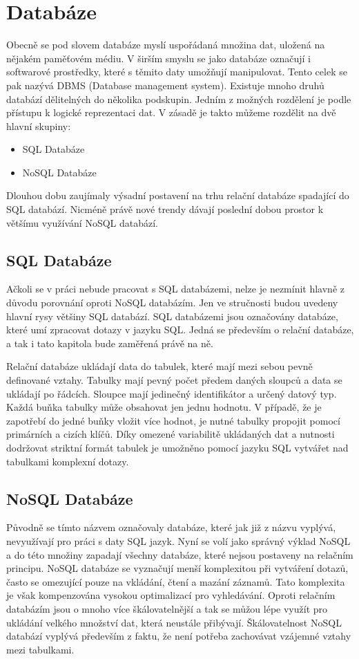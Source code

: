 \documentclass[thesis=M,czech]{FITthesis}[2012/06/26]
\begin{document}
\section{Databáze}
Obecně se pod slovem databáze myslí uspořádaná množina dat, uložená na nějakém paměťovém médiu. V širším smyslu se jako databáze označují i softwarové prostředky, které s těmito daty umožňují manipulovat. Tento celek se pak nazývá DBMS (Database management system). Existuje mnoho druhů databází dělitelných do několika podskupin. Jedním z možných rozdělení je podle přístupu k logické reprezentaci dat. V zásadě je takto můžeme rozdělit na dvě hlavní skupiny:

\begin{itemize}
\item SQL Databáze
\item NoSQL Databáze
\end{itemize}

Dlouhou dobu zaujímaly výsadní postavení na trhu relační databáze spadající do SQL databází. Nicméně právě nové trendy dávají poslední dobou prostor k většímu využívání NoSQL databází.

\subsection{SQL Databáze}
Ačkoli se v práci nebude pracovat s SQL databázemi, nelze je nezmínit hlavně z důvodu porovnání oproti NoSQL databázím. Jen ve stručnosti budou uvedeny hlavní rysy většiny SQL databází. SQL databázemi jsou označovány databáze, které umí zpracovat dotazy v jazyku SQL. Jedná se především o relační databáze, a tak i tato kapitola bude zaměřená právě na ně.

Relační databáze ukládají data do tabulek, které mají mezi sebou pevně definované vztahy. Tabulky mají pevný počet předem daných sloupců a data se ukládají po řádcích. Sloupce mají jedinečný identifikátor a určený datový typ. Každá buňka tabulky může obsahovat jen jednu hodnotu. V případě, že je zapotřebí do jedné buňky vložit více hodnot, je nutné tabulky propojit pomocí primárních a cizích klíčů. Díky omezené variabilitě ukládaných dat a nutnosti dodržovat striktní formát tabulek je umožněno pomocí jazyku SQL vytvářet nad tabulkami komplexní dotazy.


\subsection{NoSQL Databáze}
Původně se tímto názvem označovaly databáze, které jak již z názvu vyplývá, nevyužívají pro práci s daty SQL jazyk. Nyní se volí jako správný výklad NoSQL   a do této množiny zapadají všechny databáze, které nejsou postaveny na relačním principu.  NoSQL databáze se vyznačují menší komplexitou při vytváření dotazů, často se omezující pouze na vkládání, čtení a mazání záznamů. Tato komplexita je však kompenzována vysokou optimalizací pro vyhledávání. Oproti relačním databázím jsou o mnoho více škálovatelnější a tak se můžou lépe využít pro ukládání velkého množství dat, která neustále přibývají. Škálovatelnost NoSQL databází vyplývá především z faktu, že není potřeba zachovávat vzájemné vztahy mezi tabulkami.
\end{document}
